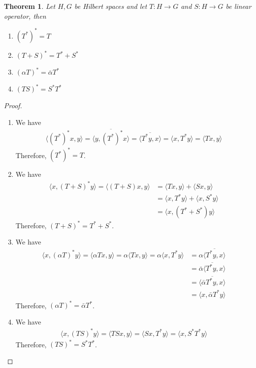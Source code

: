 \documentclass{report}
\newtheorem{thm}{Theorem}
\begin{document}
\begin{thm}
  Let $H,G$ be Hilbert spaces and let $T:H\to G$ and $S:H\to G$ be linear operator, then
  \begin{enumerate}
    \item $\left(T^{*}\right)^{*}=T$
    \item $(T+S)^{*} = T^{*} + S^{*}$
    \item $(\alpha T)^{*} = \bar{\alpha}T^{*}$
    \item $(TS)^{*} = S^{*}T^{*}$
  \end{enumerate}
\end{thm}
\begin{proof}
  \begin{enumerate}
    \item We have
      $$
      \begin{aligned}
        \langle\left(T^{*}\right)^{*}x,y\rangle = \overline{\langle y,\left(T^{*}\right)^{*}x\rangle} = \overline{\langle T^{*}y,x\rangle} = \langle x,T^{*}y\rangle = \langle Tx,y\rangle
      \end{aligned}
      $$
      Therefore, $\left(T^{*}\right)^{*}=T$.
    \item We have
      $$
      \begin{aligned}
        \langle x,(T+S)^{*}y\rangle = \langle (T+S)x,y\rangle &= \langle Tx,y\rangle+\langle Sx,y\rangle\\
                                                              &= \langle x,T^{*}y\rangle+\langle x,S^{*}y\rangle \\
                                                              &= \langle x,(T^{*}+S^{*})y\rangle
      \end{aligned}
      $$
      Therefore, $(T+S)^{*} = T^{*}+S^{*}$.
    \item We have
      $$
      \begin{aligned}
        \langle x,(\alpha T)^{*}y\rangle = \langle\alpha Tx,y\rangle = \alpha\langle Tx,y\rangle = \alpha\langle x,T^{*}y\rangle &= \alpha\overline{\langle T^{*}y,x\rangle} \\
                                                                                                                                 &= \overline{\bar{\alpha}\langle T^{*}y,x\rangle} \\
                                                                                                                                 &= \overline{\langle \bar{\alpha}T^{*}y,x\rangle} \\
                                                                                                                                 &= \langle x,\bar{\alpha}T^{*}y\rangle
      \end{aligned}
      $$
      Therefore, $(\alpha T)^{*} = \bar{\alpha}T^{*}$.
    \item We have
      $$
      \begin{aligned}
        \langle x,(TS)^{*}y\rangle = \langle TSx,y\rangle = \langle Sx,T^{*}y\rangle = \langle x,S^{*}T^{*}y\rangle
      \end{aligned}
      $$
      Therefore, $(TS)^{*} = S^{*}T^{*}$.
  \end{enumerate}
\end{proof}
\end{document}
